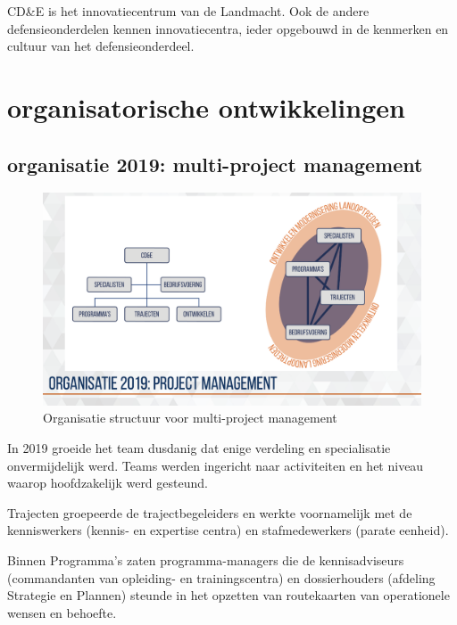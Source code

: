 \documentclass[
]{book}
\begin{document}
CD\&E is het innovatiecentrum van de Landmacht. Ook de andere defensieonderdelen kennen innovatiecentra, ieder opgebouwd in de kenmerken en cultuur van het defensieonderdeel.

\hypertarget{organisatorische-ontwikkelingen}{%
\section{organisatorische ontwikkelingen}\label{organisatorische-ontwikkelingen}}

\hypertarget{organisatie-2019-multi-project-management}{%
\subsection{organisatie 2019: multi-project management}\label{organisatie-2019-multi-project-management}}

\begin{figure}
\includegraphics[width=26.67in]{data/keynote-slides/20200430-CDE-Designprocess/20200430-CDE-Designprocess.009-2} \caption{Organisatie structuur voor multi-project management }\label{fig:unnamed-chunk-7}
\end{figure}

In 2019 groeide het team dusdanig dat enige verdeling en specialisatie onvermijdelijk werd. Teams werden ingericht naar activiteiten en het niveau waarop hoofdzakelijk werd gesteund.

Trajecten groepeerde de trajectbegeleiders en werkte voornamelijk met de kenniswerkers (kennis- en expertise centra) en stafmedewerkers (parate eenheid).

Binnen Programma's zaten programma-managers die de kennisadviseurs (commandanten van opleiding- en trainingscentra) en dossierhouders (afdeling Strategie en Plannen) steunde in het opzetten van routekaarten van operationele wensen en behoefte.
\end{document}
